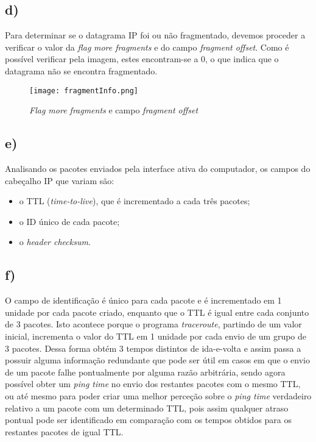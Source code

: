 \documentclass{llncs}
\begin{document}
\subsection*{d)}

Para determinar se o datagrama IP foi ou não fragmentado, devemos proceder a verificar o valor da \textit{flag} \textit{more fragments} e do campo \textit{fragment offset}. Como é possível verificar pela imagem, estes encontram-se a 0, o que indica que o datagrama não se encontra fragmentado.

\begin{figure}[!ht]
    \begin{center}
        \texttt{[image: fragmentInfo.png]}
        \caption{\textit{Flag more fragments} e campo \textit{fragment offset}}
    \end{center}
\end{figure}

\subsection*{e)}

Analisando os pacotes enviados pela interface ativa do computador, os campos do cabeçalho IP que variam são:

\begin{itemize}
    \item o TTL (\textit{time-to-live}), que é incrementado a cada três pacotes;
    \item o ID único de cada pacote;
    \item o \textit{header checksum}.
\end{itemize}

\subsection*{f)}

O campo de identificação é único para cada pacote e é incrementado em 1 unidade por cada pacote criado, enquanto que o TTL é igual entre cada conjunto de 3 pacotes. Isto acontece porque o programa \textit{traceroute}, partindo de um valor inicial, incrementa o valor do TTL em 1 unidade por cada envio de um grupo de 3 pacotes. Dessa forma obtém 3 tempos distintos de ida-e-volta e assim passa a possuir alguma informação redundante que pode ser útil em casos em que o envio de um pacote falhe pontualmente por alguma razão arbitrária, sendo agora possível obter um \textit{ping time} no envio dos restantes pacotes com o mesmo TTL, ou até mesmo para poder criar uma melhor perceção sobre o \textit{ping time} verdadeiro relativo a um pacote com um determinado TTL, pois assim qualquer atraso pontual pode ser identificado em comparação com os tempos obtidos para os restantes pacotes de igual TTL.
\end{document}
